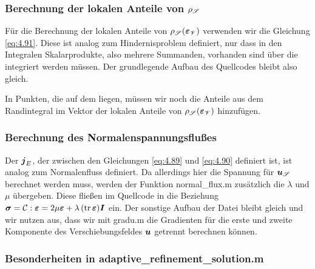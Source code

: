 \subsubsection{Berechnung der lokalen Anteile von $\rho_{\mathscr S}$}

Für die Berechnung der lokalen Anteile von $\rho_{\mathscr S}(\boldsymbol{\varepsilon}_{\mathscr V})$ verwenden wir die Gleichung \eqref{eq:4.91}. Diese ist analog zum Hindernisproblem definiert, nur dass in den Integralen Skalarprodukte, also mehrere Summanden, vorhanden sind über die integriert werden müssen. Der grundlegende Aufbau des Quellcodes bleibt also gleich. 

In Punkten, die auf dem  liegen, müssen wir noch die Anteile aus dem Randintegral im Vektor der lokalen Anteile von $\rho_{\mathscr S}(\boldsymbol{\varepsilon}_{\mathscr V})$ hinzufügen. 



\subsubsection{Berechnung des Normalenspannungsflußes}

Der  $\boldsymbol j_E$, der zwischen den Gleichungen \eqref{eq:4.89} und \eqref{eq:4.90} definiert ist, ist analog zum Normalenfluss definiert. Da allerdings hier die Spannung für $\boldsymbol u_{\mathscr S}$ berechnet werden muss, werden der Funktion {\ttfamily normal_flux.m} zusätzlich die  $\lambda$ und $\mu$ übergeben. Diese fließen im Quellcode in die Beziehung $\boldsymbol\sigma = \mathcal C:\boldsymbol {\varepsilon} = 2\mu \boldsymbol {\varepsilon} + \lambda \,  (\operatorname{tr} \boldsymbol {\varepsilon})  \boldsymbol I$ ein. Der sonstige Aufbau der Datei bleibt gleich und wir nutzen aus, dass wir mit {\ttfamily gradu.m} die Gradienten für die erste und zweite Komponente des Verschiebungsfeldes $\boldsymbol u$ getrennt berechnen können.



\subsubsection{Besonderheiten in {\ttfamily adaptive_refinement_solution.m}}


